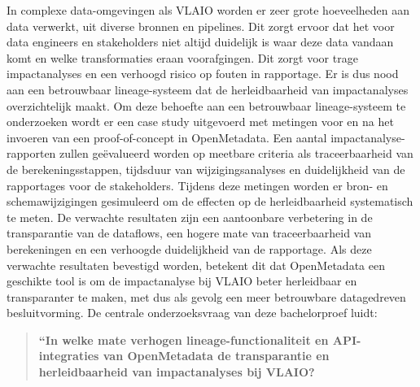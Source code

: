 \documentclass[dutch,dit,thesis]{hogentreport}
\begin{document}
In complexe data-omgevingen als VLAIO worden er zeer grote hoeveelheden aan data verwerkt, uit diverse bronnen en pipelines. Dit zorgt ervoor dat het voor data engineers en stakeholders niet altijd duidelijk is waar deze data vandaan komt en welke transformaties eraan voorafgingen. Dit zorgt voor trage impactanalyses en een verhoogd risico op fouten in rapportage. Er is dus nood aan een betrouwbaar lineage-systeem dat de herleidbaarheid van impactanalyses overzichtelijk maakt. 
Om deze behoefte aan een betrouwbaar lineage-systeem te onderzoeken wordt er een case study uitgevoerd met metingen voor en na het invoeren van een proof-of-concept in OpenMetadata. Een aantal impactanalyse-rapporten zullen geëvalueerd worden op meetbare criteria als traceerbaarheid van de berekeningsstappen, tijdsduur van wijzigingsanalyses en duidelijkheid van de rapportages voor de stakeholders. Tijdens deze metingen worden er bron- en schemawijzigingen gesimuleerd om de effecten op de herleidbaarheid systematisch te meten.
De verwachte resultaten zijn een aantoonbare verbetering in de transparantie van de dataflows, een hogere mate van traceerbaarheid van berekeningen en een verhoogde duidelijkheid van de rapportage.
Als deze verwachte resultaten bevestigd worden, betekent dit dat OpenMetadata een geschikte tool is om de impactanalyse bij VLAIO beter herleidbaar en transparanter te maken, met dus als gevolg een meer betrouwbare datagedreven besluitvorming.
De centrale onderzoeksvraag van deze bachelorproef luidt: 
\begin{quote}
\textbf{“In welke mate verhogen lineage-functionaliteit en API-integraties van OpenMetadata de transparantie en herleidbaarheid van impactanalyses bij VLAIO?}
\end{quote}




%


\backmatter{}

\setlength\bibitemsep{2pt} %
\printbibliography[heading=bibintoc]
\end{document}
